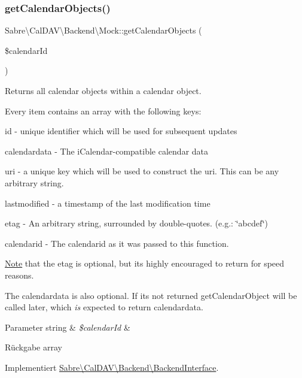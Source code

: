 \subsubsection{\texorpdfstring{get\+Calendar\+Objects()}{getCalendarObjects()}}
{\footnotesize\ttfamily Sabre\textbackslash{}\+Cal\+D\+A\+V\textbackslash{}\+Backend\textbackslash{}\+Mock\+::get\+Calendar\+Objects (\begin{DoxyParamCaption}\item[{}]{\$calendar\+Id }\end{DoxyParamCaption})}

Returns all calendar objects within a calendar object.

Every item contains an array with the following keys\+:
\begin{DoxyItemize}
\item id -\/ unique identifier which will be used for subsequent updates
\item calendardata -\/ The i\+Calendar-\/compatible calendar data
\item uri -\/ a unique key which will be used to construct the uri. This can be any arbitrary string.
\item lastmodified -\/ a timestamp of the last modification time
\item etag -\/ An arbitrary string, surrounded by double-\/quotes. (e.\+g.\+: \textquotesingle{} \char`\"{}abcdef\char`\"{}\textquotesingle{})
\item calendarid -\/ The calendarid as it was passed to this function.
\end{DoxyItemize}

\mbox{\hyperlink{class_note}{Note}} that the etag is optional, but it\textquotesingle{}s highly encouraged to return for speed reasons.

The calendardata is also optional. If it\textquotesingle{}s not returned \textquotesingle{}get\+Calendar\+Object\textquotesingle{} will be called later, which {\itshape is} expected to return calendardata.


\begin{DoxyParams}[1]{Parameter}
string & {\em \$calendar\+Id} & \\
\hline
\end{DoxyParams}
\begin{DoxyReturn}{Rückgabe}
array 
\end{DoxyReturn}


Implementiert \mbox{\hyperlink{interface_sabre_1_1_cal_d_a_v_1_1_backend_1_1_backend_interface_aaa786269ba9eb1731fb659b67f684ac2}{Sabre\textbackslash{}\+Cal\+D\+A\+V\textbackslash{}\+Backend\textbackslash{}\+Backend\+Interface}}.



